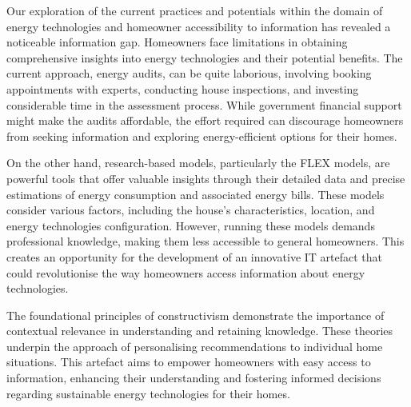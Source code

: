 Our exploration of the current practices and potentials within the domain of energy technologies and homeowner accessibility to information has revealed a noticeable information gap. 
Homeowners face limitations in obtaining comprehensive insights into energy technologies and their potential benefits.
The current approach, energy audits, can be quite laborious, 
involving booking appointments with experts, conducting house inspections, and investing considerable time in the assessment process. 
While government financial support might make the audits affordable, 
the effort required can discourage homeowners from seeking information and exploring energy-efficient options for their homes.

On the other hand, research-based models, particularly the FLEX models, 
are powerful tools that offer valuable insights through their detailed data and precise estimations of energy consumption and associated energy bills. 
These models consider various factors, including the house's characteristics, location, and energy technologies configuration. 
However, running these models demands professional knowledge, making them less accessible to general homeowners.
This creates an opportunity for the development of an innovative IT artefact that could revolutionise the way homeowners access information about energy technologies. 

The foundational principles of constructivism demonstrate the importance of contextual relevance in understanding and retaining knowledge.
These theories underpin the approach of personalising recommendations to individual home situations.
This artefact aims to empower homeowners with easy access to information, enhancing their understanding and fostering informed decisions regarding sustainable energy technologies for their homes.